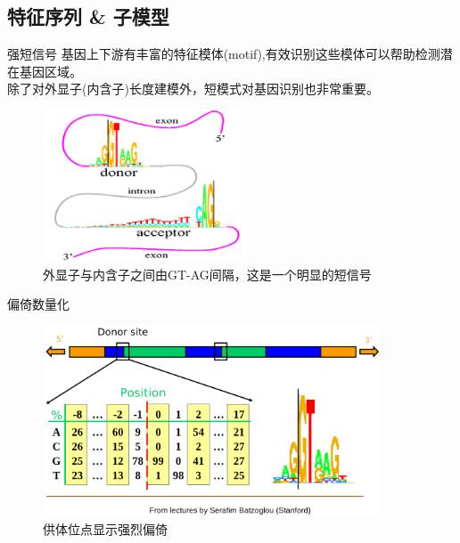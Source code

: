 \documentclass[handout]{beamer}
\begin{document}
\subsection{特征序列 \& 子模型}
\begin{frame}{强短信号}
基因上下游有丰富的特征模体(\alert{motif}),有效识别这些模体可以帮助检测潜在基因区域。\\
除了对外显子(内含子)长度建模外，短模式对基因识别也非常重要。
\begin{figure}
\includegraphics[width=6cm]{../pic/motif_GTAG}
\caption{外显子与内含子之间由GT-AG间隔，这是一个明显的短信号}
\end{figure}

\end{frame}
\begin{frame}{偏倚数量化}
\begin{figure}
\centering
\includegraphics[width=10cm]{../pic/frequency-bias}
\caption{供体位点显示强烈偏倚}
\end{figure}
\end{frame}
\end{document}
